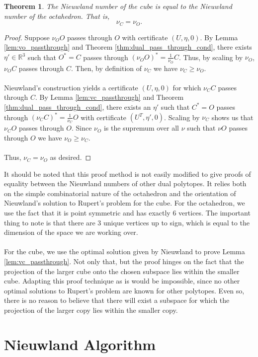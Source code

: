 \documentclass[a4paper]{amsart}
\newtheorem{thm}{Theorem}
\theoremstyle{remark}
\begin{document}
\begin{thm} \label{thm:oct_nieuwland} The Nieuwland number of the cube is equal to the Nieuwland number of the octahedron. That is,
	$$\nu_C=\nu_O.$$    
\end{thm}
\begin{proof}
	Suppose $\nu_O O$ passes through $O$ with certificate $(U,\eta,0)$. By Lemma \ref{lem:vo_passthrough} and Theorem \ref{thm:dual_pass_through_cond}, there exists $\eta'\in\mathbb{R}^3$ such that $O^*=C$ passes through $(\nu_O O)^*=\frac{1}{\nu_O}C$. Thus, by scaling by $\nu_O$, $\nu_O C$ passes through $C$. Then, by definition of $\nu_C$ we have $\nu_C \geq \nu_O$.
	\\\\
	Nieuwland's construction yields a certificate $(U,\eta,0)$ for which $\nu_C C$ passes through $C$. By Lemma \ref{lem:vc_passthrough} and Theorem \ref{thm:dual_pass_through_cond}, there exists an $\eta'$ such that $C^*=O$ passes through $(\nu_CC)^*=\frac{1}{\nu_C}O$ with certificate $(U^T,\eta',0)$. Scaling by $\nu_C$ shows us that $\nu_C O$ passes through $O$. Since $\nu_O$ is the supremum over all $\nu$ such that $\nu O$ passes through $O$ we have $\nu_O \geq \nu_C$.
    \\\\
    Thus, $\nu_C=\nu_O$ as desired.
\end{proof}
\noindent
It should be noted that this proof method is not easily modified to give proofs of equality between the Nieuwland numbers of other dual polytopes. It relies both on the simple combinatorial nature of the octahedron and the orientation of Nieuwland's solution to Rupert's problem for the cube. For the octahedron, we use the fact that it is point symmetric and has exactly 6 vertices. The important thing to note is that there are 3 unique vertices up to sign, which is equal to the dimension of the space we are working over.
\\\\
For the cube, we use the optimal solution given by Nieuwland to prove Lemma \ref{lem:vc_passthrough}. Not only that, but the proof hinges on the fact that the projection of the larger cube onto the chosen subspace lies within the smaller cube. Adapting this proof technique as is would be impossible, since no other optimal solutions to Rupert's problem are known for other polytopes. Even so, there is no reason to believe that there will exist a subspace for which the projection of the larger copy lies within the smaller copy.

\section{Nieuwland Algorithm} \label{sec:main_algorithm}
\end{document}
